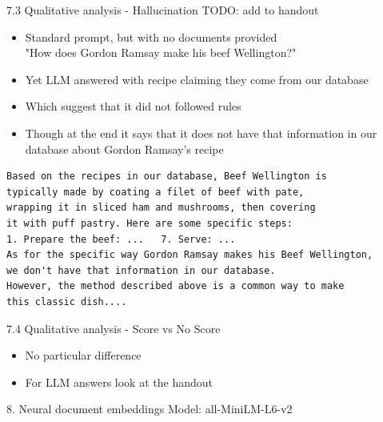 \documentclass{beamer}
\begin{document}
\begin{frame}[fragile]{7.3 Qualitative analysis - Hallucination}
  TODO: add to handout
  \begin{itemize}
    \item Standard prompt, but with no documents provided \\
          "How does Gordon Ramsay make his beef Wellington?"
    \item Yet LLM answered with recipe claiming they come from our database
    \item Which suggest that it did not followed rules
    \item Though at the end it says that it does not have that information in our database
          about Gordon Ramsay's recipe
  \end{itemize}
  \begin{verbatim}
Based on the recipes in our database, Beef Wellington is 
typically made by coating a filet of beef with pate,
wrapping it in sliced ham and mushrooms, then covering 
it with puff pastry. Here are some specific steps:
1. Prepare the beef: ...   7. Serve: ...
As for the specific way Gordon Ramsay makes his Beef Wellington,
we don't have that information in our database.
However, the method described above is a common way to make
this classic dish....
  \end{verbatim}
\end{frame}

\begin{frame}{7.4 Qualitative analysis - Score vs No Score}
  \begin{itemize}
    \item No particular difference
    \item For LLM answers look at the handout
  \end{itemize}
\end{frame}

\begin{frame}{8. Neural document embeddings}
  Model: all-MiniLM-L6-v2
\end{frame}
\end{document}
